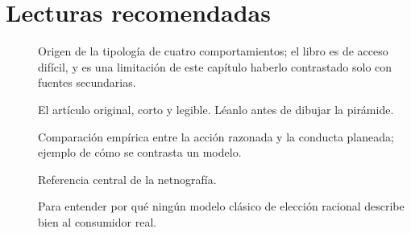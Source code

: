 \section{Lecturas recomendadas}

\begin{description}
  \item[\textcite{assael1987}] Origen de la tipología de cuatro comportamientos; el libro es de acceso difícil, y es una limitación de este capítulo haberlo contrastado solo con fuentes secundarias.
  \item[\textcite{maslow1943}] El artículo original, corto y legible. Léanlo antes de dibujar la pirámide.
  \item[\textcite{madden1992}] Comparación empírica entre la acción razonada y la conducta planeada; ejemplo de cómo se contrasta un modelo.
  \item[\textcite{kozinets2002}] Referencia central de la netnografía.
  \item[\textcite{simon1955}] Para entender por qué ningún modelo clásico de elección racional describe bien al consumidor real.
\end{description}
